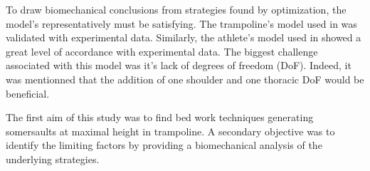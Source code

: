 To draw biomechanical conclusions from strategies found by optimization, the model's representatively  must be satisfying.
The trampoline's model used in \cite{jacques2008determining} was validated with experimental data.
Similarly, the athlete's model used in \cite{burke2015mechanics} showed a great level of accordance with experimental data.
The biggest challenge associated with this model was it's lack of degrees of freedom (DoF).
Indeed, it was mentionned  that the addition of one shoulder and one thoracic DoF would be beneficial.


The first aim of this study was to find bed work techniques  generating somersaults at maximal height in trampoline. 
A secondary objective was to identify the limiting factors by providing a biomechanical analysis of the underlying strategies.


